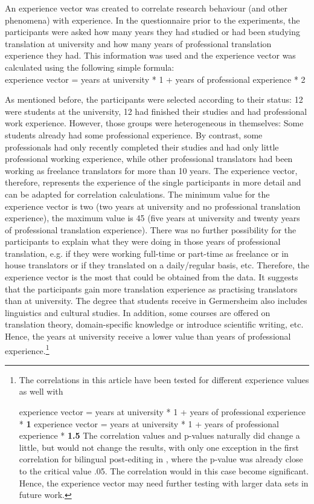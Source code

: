 \documentclass[output=paper]{langsci/langscibook}
\begin{document}
An experience vector was created to correlate research behaviour (and other phenomena) with experience. In the questionnaire prior to the experiments, the participants were asked how many years they had studied or had been studying translation at university and how many years of professional translation experience they had. This information was used and the experience vector was calculated using the following simple formula:\\

\ea
\small 
experience vector = years at university * 1 + years of professional experience * 2
\z



As mentioned before, the participants were selected according to their status: 12 were students at the university, 12 had finished their studies and had professional work experience. However, those groups were heterogeneous in themselves: Some students already had some professional experience. By contrast, some professionals had only recently completed their studies and had only little professional working experience, while other professional translators had been working as freelance translators for more than 10 years. The experience vector, therefore, represents the experience of the single participants in more detail and can be adapted for correlation calculations. The minimum value for the experience vector is two (two years at university and no professional translation experience), the maximum value is 45 (five years at university and twenty years of professional translation experience). There was no further possibility for the participants to explain what they were doing in those years of professional translation, e.g. if they were working full-time or part-time as freelance or in house translators or if they translated on a daily/regular basis, etc. Therefore, the experience vector is the most that could be obtained from the data. It suggests that the participants gain more translation experience as practising translators than at university. The degree that students receive in Germersheim also includes linguistics and cultural studies. In addition, some courses are offered on translation theory, domain-specific knowledge or introduce scientific writing, etc. Hence, the years at university receive a lower value than years of professional experience.\footnote{The correlations in this article have been tested for different experience values as well with

\ea  \upshape experience vector = years at university * 1 + years of professional experience * \textbf{1}
\z
\ea   \upshape experience vector = years at university * 1 + years of professional experience *\textbf{ 1.5}
\z
The correlation values and p-values naturally did change a little, but would not change the results, with only one exception in the first correlation for bilingual post-editing in , where the p-value was already close to the critical value .05. The correlation would in this case become significant. Hence, the experience vector may need further testing with larger data sets in future work.}
\end{document}
